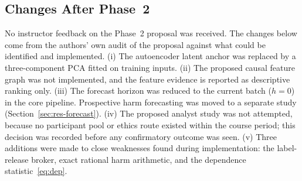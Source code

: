 \subsection{Changes After Phase~2}
\label{sec:changes}
No instructor feedback on the Phase~2 proposal was received. The changes below come
from the authors' own audit of the proposal against what could be identified and
implemented. (i) The autoencoder latent anchor was replaced by a three-component PCA
fitted on training inputs. (ii) The proposed causal feature graph was not
implemented, and the feature evidence is reported as descriptive ranking only.
(iii) The forecast horizon was reduced to the current batch ($h=0$) in the core
pipeline. Prospective harm forecasting was moved to a separate study
(Section~\ref{sec:res-forecast}). (iv) The proposed analyst study was not attempted,
because no participant pool or ethics route existed within the course period; this
decision was recorded before any confirmatory outcome was seen. (v) Three additions
were made to close weaknesses found during implementation: the label-release broker,
exact rational harm arithmetic, and the dependence statistic~\eqref{eq:dep}.
